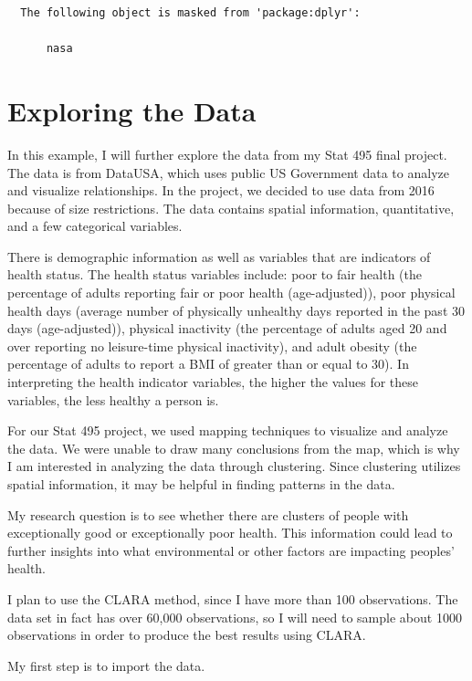\documentclass[12pt,twoside]{amherstthesis}
\begin{document}
  \begin{verbatim}
  The following object is masked from 'package:dplyr':
  
      nasa
  \end{verbatim}
  
  \section{Exploring the Data}\label{exploring-the-data}
  
  In this example, I will further explore the data from my Stat 495 final
  project. The data is from DataUSA, which uses public US Government data
  to analyze and visualize relationships. In the project, we decided to
  use data from 2016 because of size restrictions. The data contains
  spatial information, quantitative, and a few categorical variables.
  
  There is demographic information as well as variables that are
  indicators of health status. The health status variables include: poor
  to fair health (the percentage of adults reporting fair or poor health
  (age-adjusted)), poor physical health days (average number of physically
  unhealthy days reported in the past 30 days (age-adjusted)), physical
  inactivity (the percentage of adults aged 20 and over reporting no
  leisure-time physical inactivity), and adult obesity (the percentage of
  adults to report a BMI of greater than or equal to 30). In interpreting
  the health indicator variables, the higher the values for these
  variables, the less healthy a person is.
  
  For our Stat 495 project, we used mapping techniques to visualize and
  analyze the data. We were unable to draw many conclusions from the map,
  which is why I am interested in analyzing the data through clustering.
  Since clustering utilizes spatial information, it may be helpful in
  finding patterns in the data.
  
  My research question is to see whether there are clusters of people with
  exceptionally good or exceptionally poor health. This information could
  lead to further insights into what environmental or other factors are
  impacting peoples' health.
  
  I plan to use the CLARA method, since I have more than 100 observations.
  The data set in fact has over 60,000 observations, so I will need to
  sample about 1000 observations in order to produce the best results
  using CLARA.
  
  My first step is to import the data.
  
\end{document}
